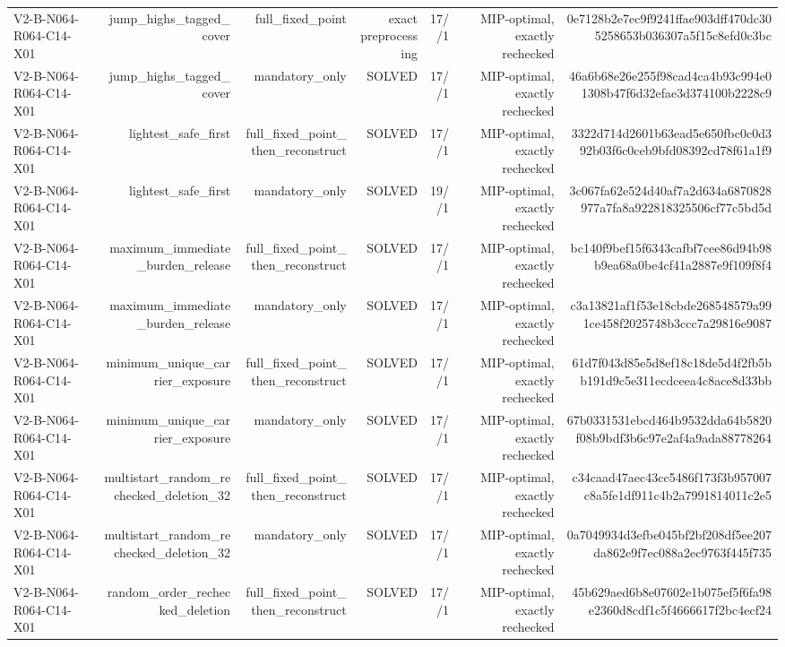{\begin{longtable}{lrrrrrr}
V2-B-N064-R064-C14-X01 & jump\_highs\_tagged\_cover & full\_fixed\_point & exact preprocessing & 17//1 & MIP-optimal, exactly rechecked & 0e7128b2e7ec9f9241ffae903dff470dc305258653b036307a5f15c8efd0c3bc \\
V2-B-N064-R064-C14-X01 & jump\_highs\_tagged\_cover & mandatory\_only & SOLVED & 17//1 & MIP-optimal, exactly rechecked & 46a6b68e26e255f98cad4ca4b93c994e01308b47f6d32efae3d374100b2228c9 \\
V2-B-N064-R064-C14-X01 & lightest\_safe\_first & full\_fixed\_point\_then\_reconstruct & SOLVED & 17//1 & MIP-optimal, exactly rechecked & 3322d714d2601b63ead5e650fbc0c0d392b03f6c0ceb9bfd08392cd78f61a1f9 \\
V2-B-N064-R064-C14-X01 & lightest\_safe\_first & mandatory\_only & SOLVED & 19//1 & MIP-optimal, exactly rechecked & 3c067fa62e524d40af7a2d634a6870828977a7fa8a922818325506cf77c5bd5d \\
V2-B-N064-R064-C14-X01 & maximum\_immediate\_burden\_release & full\_fixed\_point\_then\_reconstruct & SOLVED & 17//1 & MIP-optimal, exactly rechecked & bc140f9bef15f6343cafbf7cee86d94b98b9ea68a0be4cf41a2887e9f109f8f4 \\
V2-B-N064-R064-C14-X01 & maximum\_immediate\_burden\_release & mandatory\_only & SOLVED & 17//1 & MIP-optimal, exactly rechecked & c3a13821af1f53e18cbde268548579a991ce458f2025748b3ccc7a29816e9087 \\
V2-B-N064-R064-C14-X01 & minimum\_unique\_carrier\_exposure & full\_fixed\_point\_then\_reconstruct & SOLVED & 17//1 & MIP-optimal, exactly rechecked & 61d7f043d85e5d8ef18c18de5d4f2fb5bb191d9c5e311ecdceea4c8ace8d33bb \\
V2-B-N064-R064-C14-X01 & minimum\_unique\_carrier\_exposure & mandatory\_only & SOLVED & 17//1 & MIP-optimal, exactly rechecked & 67b0331531ebcd464b9532dda64b5820f08b9bdf3b6c97e2af4a9ada88778264 \\
V2-B-N064-R064-C14-X01 & multistart\_random\_rechecked\_deletion\_32 & full\_fixed\_point\_then\_reconstruct & SOLVED & 17//1 & MIP-optimal, exactly rechecked & c34caad47aec43cc5486f173f3b957007c8a5fe1df911c4b2a7991814011c2e5 \\
V2-B-N064-R064-C14-X01 & multistart\_random\_rechecked\_deletion\_32 & mandatory\_only & SOLVED & 17//1 & MIP-optimal, exactly rechecked & 0a7049934d3efbe045bf2bf208df5ee207da862e9f7ec088a2ec9763f445f735 \\
V2-B-N064-R064-C14-X01 & random\_order\_rechecked\_deletion & full\_fixed\_point\_then\_reconstruct & SOLVED & 17//1 & MIP-optimal, exactly rechecked & 45b629aed6b8e07602e1b075ef5f6fa98e2360d8cdf1c5f4666617f2bc4ecf24 \\

\end{longtable}}
